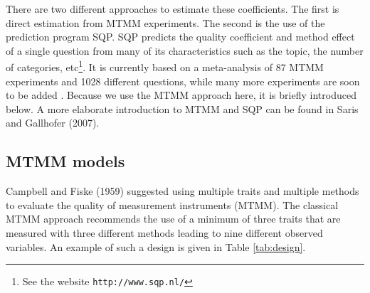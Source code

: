 \documentclass[a4paper,12pt]{article}
\begin{document}
There are two different approaches to estimate these coefficients. The first is direct estimation from MTMM experiments. The second is the use of the prediction program SQP. SQP predicts the quality coefficient and method effect of a single question from many of its characteristics such as the topic, the number of categories, etc\footnote{See the website \texttt{http://www.sqp.nl/}}. It is currently based on a meta-analysis of 87 MTMM experiments and 1028 different questions, while many more experiments are soon to be added \citep{oberski_sqp_}. Because we use the MTMM approach here, it is briefly introduced below. A more elaborate introduction to MTMM and SQP can be found in Saris and Gallhofer (2007).

\subsection{MTMM models}

Campbell and Fiske (1959) suggested using multiple traits and multiple methods to evaluate the quality of measurement instruments (MTMM). The classical MTMM approach recommends the use of a minimum of three traits that are measured with three different methods leading to nine different observed variables. An example of such a design is given in Table \ref{tab:design}.  

\begin{table}[htb]\caption{The classic MTMM design used in the ESS pilot study.\label{tab:design}}
\end{table}
\end{document}
